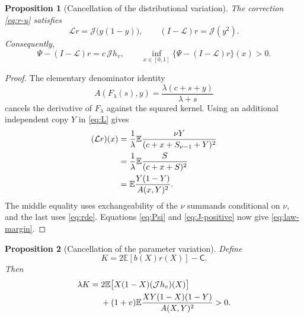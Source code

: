 \documentclass[11pt,a4paper]{article}
\numberwithin{equation}{section}
\theoremstyle{notethm}
\newtheorem{proposition}[proposition]{Proposition}
\theoremstyle{definition}
\newcommand{\E}{\mathbb E}
\newcommand{\cJ}{\mathcal J}
\newcommand{\cL}{\mathcal L}
\begin{document}
\begin{proposition}[Cancellation of the distributional variation]\label{prop:cancel-law}
The correction \eqref{eq:r-u} satisfies
\begin{equation}\label{eq:Lr}
 \cL r=\cJ\bigl(y(1-y)\bigr),\qquad
 (I-\cL)r=\cJ(y^2).
\end{equation}
Consequently,
\begin{equation}\label{eq:law-margin}
 \boxed{\quad
 \Psi-(I-\cL)r=c\,\cJ h_v,
 \qquad
 \inf_{x\in[0,1]}\{\Psi-(I-\cL)r\}(x)>0.
 \quad}
\end{equation}
\end{proposition}

\begin{proof}
The elementary denominator identity
\begin{equation}\label{eq:denom-F}
 A(F_\lambda(s),y)
 =\frac{\lambda(c+s+y)}{\lambda+s}
\end{equation}
cancels the derivative of $F_\lambda$ against the squared kernel. Using an
additional independent copy $Y$ in \eqref{eq:L} gives
\begin{align}
 (\cL r)(x)
 &=\frac1\lambda\E\frac{\nu Y}{(c+x+S_{\nu-1}+Y)^2}\notag\\
 &=\frac1\lambda\E\frac{S}{(c+x+S)^2}\notag\\
 &=\E\frac{Y(1-Y)}{A(x,Y)^2}.\label{eq:Lr-proof}
\end{align}
The middle equality uses exchangeability of the $\nu$ summands conditional
on $\nu$, and the last uses \eqref{eq:rde}. Equations \eqref{eq:Psi} and
\eqref{eq:J-positive} now give \eqref{eq:law-margin}.
\end{proof}

\begin{proposition}[Cancellation of the parameter variation]\label{prop:cancel-parameter}
Define
\begin{equation}\label{eq:K}
 K=2\E[b(X)r(X)]-\mathsf C.
\end{equation}
Then
\begin{align}
 \lambda K
 ={}&2\E\bigl[X(1-X)(\cJ h_v)(X)\bigr]\notag\\
 &+(1+v)\E\frac{XY(1-X)(1-Y)}{A(X,Y)^2}>0.
 \label{eq:K-positive}
\end{align}
\end{proposition}
\end{document}
